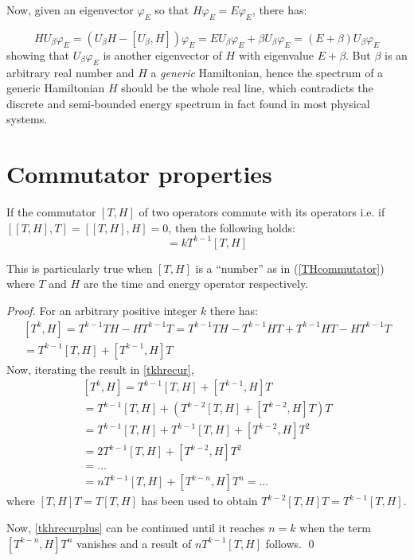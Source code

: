 \documentclass[a4paper,12pt]{article}
\begin{document}
Now, given an eigenvector $\varphi_{E}$ so that $H\varphi_{E}=E\varphi_{E}$, there has:

$$
HU_{\beta}\varphi_{E} = (U_{\beta}H - [U_{\beta}, H])\varphi_{E} =
EU_{\beta}\varphi_{E} + \beta U_{\beta}\varphi_{E} = (E+\beta)U_{\beta}\varphi_{E}
$$
showing that $U_{\beta}\varphi_{E}$ is another eigenvector of $H$ with eigenvalue
$E+\beta$. But $\beta$ is an arbitrary real number and $H$ a \emph{generic} Hamiltonian,
hence the spectrum of a generic Hamiltonian $H$ should
be the whole real line, which contradicts the discrete and semi-bounded energy spectrum
in fact found in most physical systems.

\appendix\section{Commutator properties}\label{CommProp}
\begin{lemma}
If the commutator $[T, H]$ of two operators commute with its operators i.e. if
$[[T, H], T] = [[T, H], H] = 0$, then the following holds:
\begin{equation}
[T^k, H] = kT^{k-1}[T, H]\label{eq:tkh}
\end{equation}
\end{lemma}
This is particularly true when $[T, H]$ is a ``number'' as in (\ref{THcommutator}) where
$T$ and $H$ are the time and energy operator respectively.
\begin{proof}
For an arbitrary positive integer $k$ there has:
\begin{multline}\label{tkhrecur}
[T^k, H] = T^{k-1}TH - HT^{k-1}T = T^{k-1}TH - T^{k-1}HT + T^{k-1}HT - HT^{k-1}T \\
    = T^{k-1}[T, H] + [T^{k-1}, H]T
\end{multline}
Now, iterating the result in \ref{tkhrecur},
\begin{multline}\label{tkhrecurplus}
[T^k, H] = T^{k-1}[T, H] + [T^{k-1}, H]T \\
= T^{k-1}[T, H] + (T^{k-2}[T, H] + [T^{k-2}, H]T)T \\
= T^{k-1}[T, H] +  T^{k-1}[T, H] + [T^{k-2}, H]T^2 \\
= 2T^{k-1}[T, H] + [T^{k-2}, H]T^2 \\
= \hdots \\
= nT^{k-1}[T, H] + [T^{k-n}, H]T^n = \hdots
\end{multline}
where $[T, H]T = T[T, H]$ has been used to obtain $T^{k-2}[T, H]T = T^{k-1}[T, H]$.

Now, \ref{tkhrecurplus} can be continued until it reaches $n=k$ when the term
$[T^{k-n}, H]T^n$ vanishes and a result of $nT^{k-1}[T, H]$ follows. \qed  
\end{proof}



\end{document}
